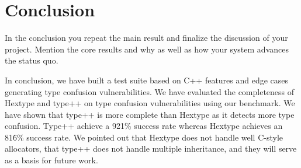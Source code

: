 \documentclass[a4paper,11pt,oneside]{report}
\begin{document}
\chapter{Conclusion}

In the conclusion you repeat the main result and finalize the discussion of
your project. Mention the core results and why as well as how your system
advances the status quo.

In conclusion, we have built a test suite based on C++ features and edge cases
generating type confusion vulnerabilities. We have evaluated the completeness of 
Hextype and type++ on type confusion vulnerabilities using our benchmark. We 
have shown that type++ is more complete than Hextype as it detects more type confusion.
Type++ achieve a 92\.1\% success rate whereas Hextype achieves an 81\.6\% success rate.
We pointed out that Hextype does not handle well C-style allocators, that 
type++ does not handle multiple inheritance, and they will serve as a basis for future work.

\cleardoublepage
{}
{}
\printbibliography

%
%
\end{document}
